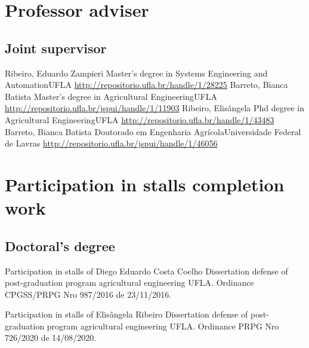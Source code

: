 \documentclass[11pt,a4paper,sans]{moderncv} %
\begin{document}
	       
\section{Professor adviser}
\subsection{Joint supervisor}
			{Ribeiro, Eduardo Zampieri}
			{Master's degree in Systems Engineering and Automation}{UFLA}
			{\url{http://repositorio.ufla.br/handle/1/28225}}
			{Barreto, Bianca Batista}
			{Master's degree in Agricultural Engineering}{UFLA}
			{\url{http://repositorio.ufla.br/jspui/handle/1/11903}}
			{Ribeiro, Elisângela }
			{Phd degree in Agricultural Engineering}{UFLA}
			{\url{http://repositorio.ufla.br/handle/1/43483}}
			{Barreto, Bianca Batista}
			{Doutorado em Engenharia Agrícola}{Universidade Federal de Lavras}
			{\url{http://repositorio.ufla.br/jspui/handle/1/46056}}

\section{Participation in stalls completion work}

\subsection{Doctoral's degree}
			{Participation in stalls of Diego Eduardo Costa Coelho}
			{Dissertation defense of post-graduation program agricultural engineering}{}
			{UFLA. Ordinance CPGSS/PRPG Nro 987/2016 de 23/11/2016.}


			{Participation in stalls of Elisângela Ribeiro}
			{Dissertation defense of post-graduation program agricultural engineering}{}
			{UFLA. Ordinance PRPG Nro 726/2020 de 14/08/2020.}
			
\end{document}
